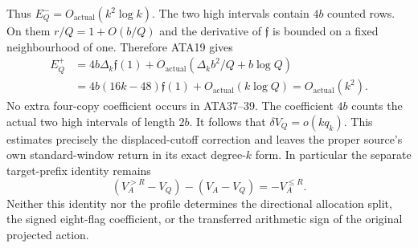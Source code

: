 Thus $E_Q^-=O_{\mathrm{actual}}(k^2\log k)$.
The two high intervals contain $4b$ counted rows.  On them
$r/Q=1+O(b/Q)$ and the derivative of $\mathfrak f$ is bounded
on a fixed neighbourhood of one.  Therefore ATA19 gives
\[
\begin{split}
 E_Q^+
 &=4b\Delta_k\mathfrak f(1)
       +O_{\mathrm{actual}}(\Delta_kb^2/Q+b\log Q)\\
 &=4b(16k-48)\mathfrak f(1)+O_{\mathrm{actual}}(k\log Q)
  =O_{\mathrm{actual}}(k^2).
\end{split}\tag{ATA39}
\]
No extra four-copy coefficient occurs in ATA37--39.  The coefficient
$4b$ counts the actual two high intervals of length $2b$.
It follows that $\delta V_Q=o(kq_k)$.  This estimates precisely the
displaced-cutoff correction and leaves the proper source's own
standard-window return in its exact degree-$k$ form.
In particular the separate target-prefix identity remains
\[
 (V_A^{>R}-V_Q)-(V_A-V_Q)=-V_A^{\le R}.                 \tag{ATA40}
\]
Neither this identity nor the profile determines the directional
allocation split, the signed eight-flag coefficient, or the transferred
arithmetic sign of the original projected action.
\endgroup
